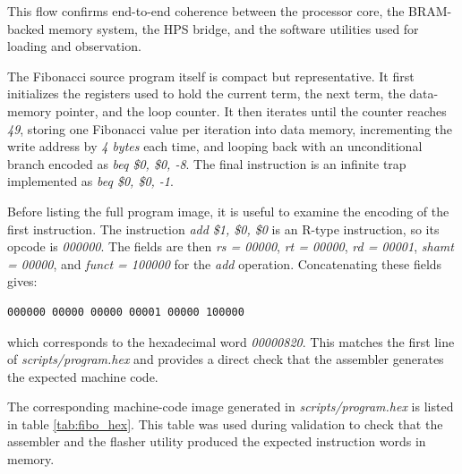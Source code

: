 \documentclass[a4paper,11pt]{scrartcl}
\begin{document}
This flow confirms end-to-end coherence between the processor core, the BRAM-backed memory system, the HPS bridge, and the software utilities used for loading and observation.

The Fibonacci source program itself is compact but representative. It first initializes the registers used to hold the current term, the next term, the data-memory pointer, and the loop counter. It then iterates until the counter reaches \emph{49}, storing one Fibonacci value per iteration into data memory, incrementing the write address by \emph{4 bytes} each time, and looping back with an unconditional branch encoded as \emph{beq \$0, \$0, -8}. The final instruction is an infinite trap implemented as \emph{beq \$0, \$0, -1}.

Before listing the full program image, it is useful to examine the encoding of the first instruction. The instruction \emph{add \$1, \$0, \$0} is an R-type instruction, so its opcode is \emph{000000}. The fields are then \emph{rs = 00000}, \emph{rt = 00000}, \emph{rd = 00001}, \emph{shamt = 00000}, and \emph{funct = 100000} for the \emph{add} operation. Concatenating these fields gives:

\begin{verbatim}
000000 00000 00000 00001 00000 100000
\end{verbatim}

which corresponds to the hexadecimal word \emph{00000820}. This matches the first line of \emph{scripts/program.hex} and provides a direct check that the assembler generates the expected machine code.

The corresponding machine-code image generated in \emph{scripts/program.hex} is listed in table \ref{tab:fibo_hex}. This table was used during validation to check that the assembler and the flasher utility produced the expected instruction words in memory.
\end{document}
